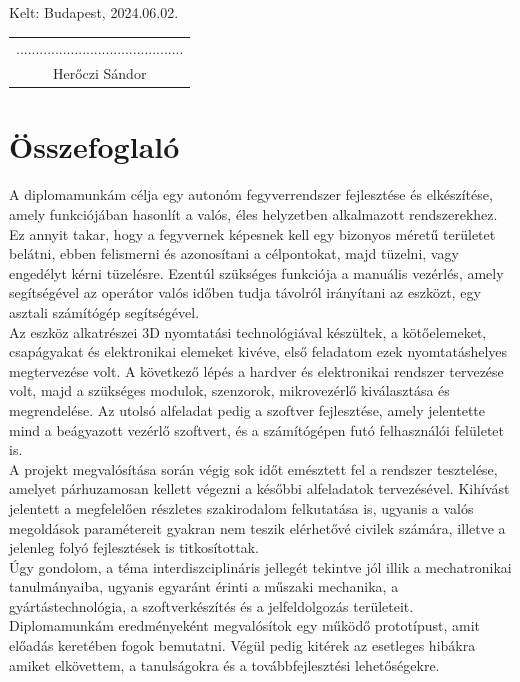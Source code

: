 \documentclass[12pt,a4paper]{article}
\newcommand{\LOCATION}{Budapest}
\begin{document}
Kelt: \LOCATION, 2024.06.02.\\

\hfill
\begin{tabular}{c}
	........................................... \\
	Herőczi Sándor \\
\end{tabular}

\pagebreak

\section*{Összefoglaló}
A diplomamunkám célja egy autonóm fegyverrendszer fejlesztése és elkészítése, amely funkciójában hasonlít a valós, éles helyzetben alkalmazott rendszerekhez. Ez annyit takar, hogy a fegyvernek képesnek kell egy bizonyos méretű területet belátni, ebben felismerni és azonosítani a célpontokat, majd tüzelni, vagy engedélyt kérni tüzelésre. Ezentúl szükséges funkciója a manuális vezérlés, amely segítségével az operátor valós időben tudja távolról irányítani az eszközt, egy asztali számítógép segítségével.\\

Az eszköz alkatrészei 3D nyomtatási technológiával készültek, a kötőelemeket, csapágyakat és elektronikai elemeket kivéve, első feladatom ezek nyomtatáshelyes megtervezése volt. A következő lépés a hardver és elektronikai rendszer tervezése volt, majd a szükséges modulok, szenzorok, mikrovezérlő kiválasztása és megrendelése. Az utolsó alfeladat pedig a szoftver fejlesztése, amely jelentette mind a beágyazott vezérlő szoftvert, és a számítógépen futó felhasználói felületet is.\\

A projekt megvalósítása során végig sok időt emésztett fel a rendszer tesztelése, amelyet párhuzamosan kellett végezni a későbbi alfeladatok tervezésével. Kihívást jelentett a megfelelően részletes szakirodalom felkutatása is, ugyanis a valós megoldások paramétereit gyakran nem teszik elérhetővé civilek számára, illetve a jelenleg folyó fejlesztések is titkosítottak.\\

Úgy gondolom, a téma interdiszciplináris jellegét tekintve jól illik a mechatronikai tanulmányaiba, ugyanis egyaránt érinti a műszaki mechanika,  a gyártástechnológia, a szoftverkészítés és a jelfeldolgozás területeit.\\

Diplomamunkám eredményeként megvalósítok egy működő prototípust, amit előadás keretében fogok bemutatni. Végül pedig kitérek az esetleges hibákra amiket elkövettem, a tanulságokra és a továbbfejlesztési lehetőségekre.
\end{document}
